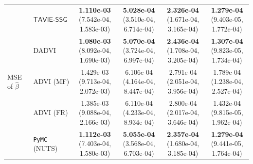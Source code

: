 \documentclass[12pt]{article}
\numberwithin{equation}{section}
\newcommand{\tssg}{\mathsf{TAVIE}\text{-}\mathsf{SSG}}
\begin{document}
{\begin{longtable}{llcccc}
\multirow{5}{*}{MSE of $\widehat{\beta}$}
& $\tssg$ & \makecell[c]{\textbf{1.110e-03}\\(7.542e-04, 1.583e-03)} & \makecell[c]{\textbf{5.028e-04}\\(3.510e-04, 6.714e-04)} & \makecell[c]{\textbf{2.326e-04}\\(1.671e-04, 3.165e-04)} & \makecell[c]{\textbf{1.279e-04}\\(9.403e-05, 1.772e-04)} \\
& DADVI & \makecell[c]{\textbf{1.080e-03}\\(8.092e-04, 1.690e-03)} & \makecell[c]{\textbf{5.070e-04}\\(3.724e-04, 6.997e-04)} & \makecell[c]{\textbf{2.436e-04}\\(1.708e-04, 3.205e-04)} & \makecell[c]{\textbf{1.307e-04}\\(9.823e-05, 1.734e-04)} \\
& ADVI (MF) & \makecell[c]{1.429e-03\\(9.713e-04, 2.072e-03)} & \makecell[c]{6.106e-04\\(4.164e-04, 8.447e-04)} & \makecell[c]{2.791e-04\\(2.051e-04, 3.956e-04)} & \makecell[c]{1.789e-04\\(1.238e-04, 2.527e-04)} \\
& ADVI (FR) & \makecell[c]{1.385e-03\\(9.088e-04, 2.166e-03)} & \makecell[c]{6.110e-04\\(4.233e-04, 8.934e-04)} & \makecell[c]{2.800e-04\\(2.017e-04, 3.646e-04)} & \makecell[c]{1.432e-04\\(9.815e-05, 1.962e-04)} \\
& \texttt{PyMC} (NUTS) & \makecell[c]{\textbf{1.112e-03}\\(7.403e-04, 1.580e-03)} & \makecell[c]{\textbf{5.055e-04}\\(3.568e-04, 6.703e-04)} & \makecell[c]{\textbf{2.357e-04}\\(1.680e-04, 3.185e-04)} & \makecell[c]{\textbf{1.279e-04}\\(9.441e-05, 1.764e-04)} \\
\hline


\end{longtable}}
\end{document}
